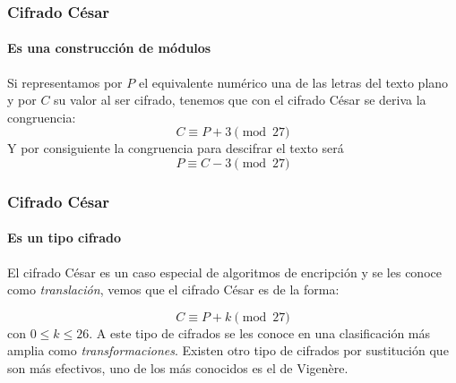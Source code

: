 \documentclass[spanish, mexico]{beamer}
\begin{document}
	\begin{frame}
		\frametitle{Cifrado César}
		\framesubtitle{Es una construcción de módulos}
		\begin{table}[]
			\centering
		\end{table}
		Si representamos por $P$ el equivalente numérico una de las letras del texto plano y por $C$ su valor al ser cifrado, tenemos que con el cifrado César se deriva la congruencia:
		$$C \equiv P + 3 \pmod{27}$$
		Y por consiguiente la congruencia para descifrar el texto será
		$$P \equiv C - 3 \pmod{27}$$ 
	\end{frame}

	\begin{frame}
		\frametitle{Cifrado César}
		\framesubtitle{Es un tipo cifrado}
		El cifrado César es un caso especial de algoritmos de encripción y se les conoce como \textit{translación}, vemos que el cifrado César es de la forma:
		
		$$C \equiv P + k \pmod{27}$$
		con $0 \leq k \leq 26$. A este tipo de cifrados se les conoce en una clasificación más amplia como \textit{transformaciones}. Existen otro tipo de cifrados por sustitución que son más efectivos, uno de los más conocidos es el de Vigenère.
	\end{frame}
\end{document}
